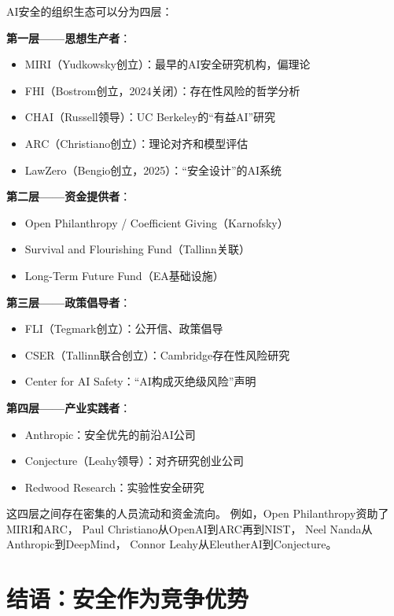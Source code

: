 \begin{keybox}[AI安全组织生态图谱]
AI安全的组织生态可以分为四层：

\textbf{第一层——思想生产者}：
\begin{itemize}[noitemsep]
  \item MIRI（Yudkowsky创立）：最早的AI安全研究机构，偏理论
  \item FHI（Bostrom创立，2024关闭）：存在性风险的哲学分析
  \item CHAI（Russell领导）：UC Berkeley的``有益AI''研究
  \item ARC（Christiano创立）：理论对齐和模型评估
  \item LawZero（Bengio创立，2025）：``安全设计''的AI系统
\end{itemize}

\textbf{第二层——资金提供者}：
\begin{itemize}[noitemsep]
  \item Open Philanthropy / Coefficient Giving（Karnofsky）
  \item Survival and Flourishing Fund（Tallinn关联）
  \item Long-Term Future Fund（EA基础设施）
\end{itemize}

\textbf{第三层——政策倡导者}：
\begin{itemize}[noitemsep]
  \item FLI（Tegmark创立）：公开信、政策倡导
  \item CSER（Tallinn联合创立）：Cambridge存在性风险研究
  \item Center for AI Safety：``AI构成灭绝级风险''声明
\end{itemize}

\textbf{第四层——产业实践者}：
\begin{itemize}[noitemsep]
  \item Anthropic：安全优先的前沿AI公司
  \item Conjecture（Leahy领导）：对齐研究创业公司
  \item Redwood Research：实验性安全研究
\end{itemize}

这四层之间存在密集的人员流动和资金流向。
例如，Open Philanthropy资助了MIRI和ARC，
Paul Christiano从OpenAI到ARC再到NIST，
Neel Nanda从Anthropic到DeepMind，
Connor Leahy从EleutherAI到Conjecture。
\end{keybox}


\section{结语：安全作为竞争优势}
\label{sec:anthropic-conclusion}

